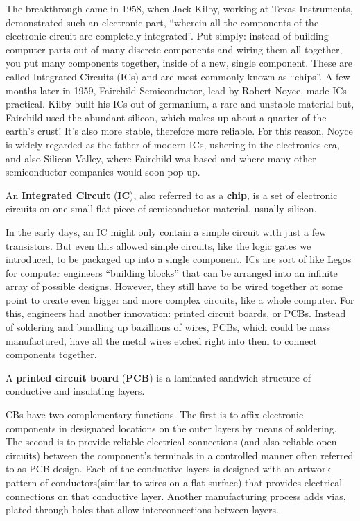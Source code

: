 The breakthrough came in 1958, when Jack Kilby, working at Texas Instruments, demonstrated such an electronic part,
``wherein all the components of the electronic circuit are completely integrated''. Put simply: instead of building
computer parts out of many discrete components and wiring them all together, you put many components together, inside
of a new, single component. These are called Integrated Circuits (ICs) and are most commonly known as ``chips''. A
few months later in 1959, Fairchild Semiconductor, lead by Robert Noyce, made ICs practical. Kilby built his ICs out
of germanium, a rare and unstable material but, Fairchild used the abundant silicon, which makes up about a quarter
of the earth's crust! It's also more stable, therefore more reliable. For this reason, Noyce is widely regarded as
the father of modern ICs, ushering in the electronics era, and also Silicon Valley, where Fairchild was based and
where many other semiconductor companies would soon pop up.

An \textbf{Integrated Circuit} (\textbf{IC}), also referred to as a \textbf{chip}, is a set of electronic circuits on
one small flat piece of semiconductor material, usually silicon.
\ed


In the early days, an IC might only contain a simple circuit with just a few transistors. But even this allowed
simple circuits, like the logic gates we introduced, to be packaged up into a single component. ICs are sort of like
Legos for computer engineers ``building blocks'' that can be arranged into an infinite array of possible designs.
However, they still have to be wired together at some point to create even bigger and more complex circuits, like a
whole computer. For this, engineers had another innovation: printed circuit boards, or PCBs. Instead of soldering and
bundling up bazillions of wires, PCBs, which could be mass manufactured, have all the metal wires etched right into
them to connect components together.

A \textbf{printed circuit board} (\textbf{PCB}) is a laminated sandwich structure of conductive and insulating layers.
\ed

CBs have two complementary functions. The first is to affix electronic components in designated locations on the
outer layers by means of soldering. The second is to provide reliable electrical connections (and also reliable open
circuits) between the component's terminals in a controlled manner often referred to as PCB design. Each of the
conductive layers is designed with an artwork pattern of conductors(similar to wires on a flat surface) that provides
electrical connections on that conductive layer. Another manufacturing process adds vias, plated-through holes that
allow interconnections between layers.

